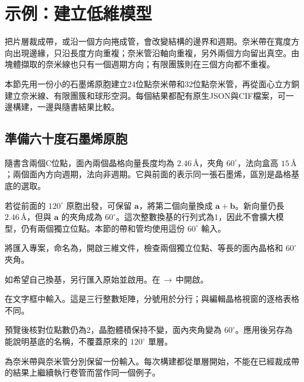 \section{示例：建立低維模型}\label{sec:nanostructure-examples}

把片層裁成帶，或沿一個方向捲成管，會改變結構的邊界和週期。奈米帶在寬度方向出現邊緣，只沿長度方向重複；奈米管沿軸向重複，另外兩個方向留出真空。由塊體擷取的奈米線也只有一個週期方向；有限團簇則在三個方向都不重複。

本節先用一份小的石墨烯原胞建立24位點奈米帶和32位點奈米管，再從面心立方銅建立奈米線、有限團簇和球形空洞。每個結果都配有原生JSON與CIF檔案，可一邊構建，一邊與隨書結果比較。

\subsection{準備六十度石墨烯原胞}

隨書含兩個C位點，面內兩個晶格向量長度均為 $2.46\,\text{\AA}$，夾角 $60^\circ$，法向盒高 $15\,\text{\AA}$；兩個面內方向週期，法向非週期。它與前面的表示同一張石墨烯，區別是晶格基底的選取。

若從前面的 $120^\circ$ 原胞出發，可保留 $\mathbf a$，將第二個向量換成 $\mathbf a+\mathbf b$。新向量仍長 $2.46\,\text{\AA}$，但與 $\mathbf a$ 的夾角成為 $60^\circ$。這次整數換基的行列式為1，因此不會擴大模型，仍有兩個獨立位點。本節的帶和管均使用這份 $60^\circ$ 輸入。

\begin{steps}
  \item 將匯入專案，命名為，開啟三維文件，檢查兩個獨立位點、等長的面內晶格和 $60^\circ$ 夾角。
  \item 如希望自己換基，另行匯入原始並啟用。在\,$\rightarrow$\,中開啟。
  \item 在文字框中輸入。這是三行整數矩陣，分號用於分行；與編輯晶格視窗的逐格表格不同。
  \item 預覽後核對位點數仍為2，晶胞體積保持不變，面內夾角變為 $60^\circ$。應用後另存為能說明基底的名稱，不覆蓋原來的 $120^\circ$ 單層。
  \item 為奈米帶與奈米管分別保留一份輸入。每次構建都從單層開始，不能在已經裁成帶的結果上繼續執行卷管而當作同一個例子。
\end{steps}


